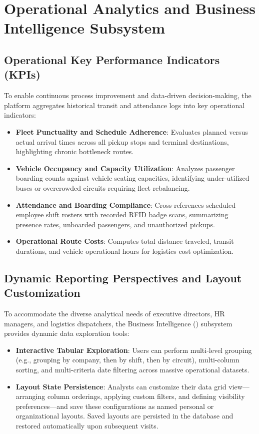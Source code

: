 \section{Operational Analytics and Business Intelligence Subsystem}
\label{sec:analytics_bi_subsystem}

\subsection{Operational Key Performance Indicators (KPIs)}
To enable continuous process improvement and data-driven decision-making, the platform aggregates historical transit and attendance logs into key operational indicators:
\begin{itemize}
  \item \textbf{Fleet Punctuality and Schedule Adherence}: Evaluates planned versus actual arrival times across all pickup stops and terminal destinations, highlighting chronic bottleneck routes.
  \item \textbf{Vehicle Occupancy and Capacity Utilization}: Analyzes passenger boarding counts against vehicle seating capacities, identifying under-utilized buses or overcrowded circuits requiring fleet rebalancing.
  \item \textbf{Attendance and Boarding Compliance}: Cross-references scheduled employee shift rosters with recorded RFID badge scans, summarizing presence rates, unboarded passengers, and unauthorized pickups.
  \item \textbf{Operational Route Costs}: Computes total distance traveled, transit durations, and vehicle operational hours for logistics cost optimization.
\end{itemize}

\subsection{Dynamic Reporting Perspectives and Layout Customization}
To accommodate the diverse analytical needs of executive directors, HR managers, and logistics dispatchers, the Business Intelligence () subsystem provides dynamic data exploration tools:
\begin{itemize}
  \item \textbf{Interactive Tabular Exploration}: Users can perform multi-level grouping (e.g., grouping by company, then by shift, then by circuit), multi-column sorting, and multi-criteria date filtering across massive operational datasets.
  \item \textbf{Layout State Persistence}: Analysts can customize their data grid view---arranging column orderings, applying custom filters, and defining visibility preferences---and save these configurations as named personal or organizational layouts. Saved layouts are persisted in the database and restored automatically upon subsequent visits.
\end{itemize}

